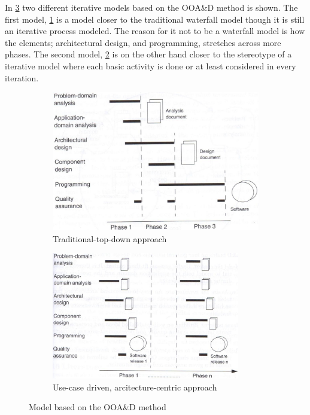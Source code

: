 
In \cref{fig:SUModels} two different iterative models based on the OOA\&D method is shown.
The first model, \cref{fig:SUModel1} is a model closer to the traditional waterfall model though it is still an iterative process modeled.
The reason for it not to be a waterfall model is how the elements; architectural design, and programming, stretches across more phases.
The second model, \cref{fig:SUModel2} is on the other hand closer to the stereotype of a iterative model where each basic activity is done or at least considered in every iteration. 

\begin{figure}[H]
	\centering
	\begin{subfigure}[b]{0.48\textwidth}
		\includegraphics[width=\textwidth]{billeder/SUModel1.jpg}
		\caption{Traditional-top-down approach \citep[p.~16]{Rod-Aalborg}}
		\label{fig:SUModel1}
	\end{subfigure}
	\quad
	\begin{subfigure}[b]{0.48\textwidth}
		\includegraphics[width=0.9\textwidth]{billeder/SUModel2.jpg}
		\caption{Use-case driven, arcitecture-centric approach \citep[p.~17]{Rod-Aalborg}}
		\label{fig:SUModel2}
	\end{subfigure}
	\caption{Model based on the OOA\&D method}\label{fig:SUModels}
\end{figure}
